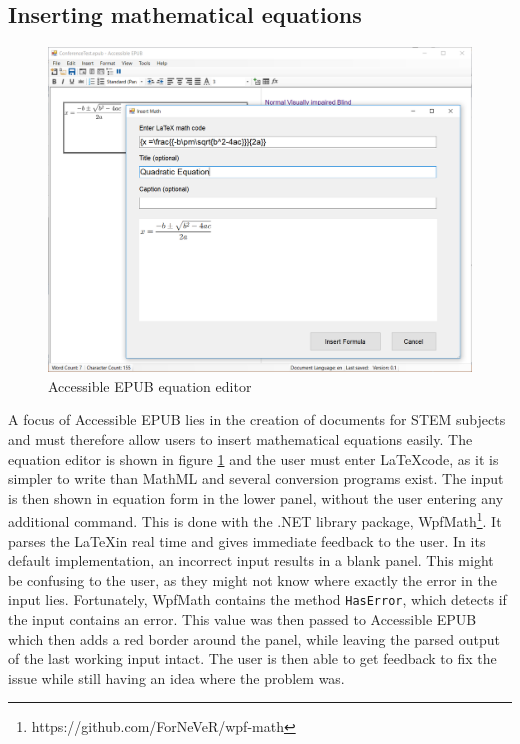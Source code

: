 \subsection{Inserting mathematical equations}

\begin{figure}[h]
	\centering
	\includegraphics[width=\textwidth*4/5]{figures/AccessibleEPUBequationNew.PNG}
	\caption{Accessible EPUB equation editor}
	\label{fig:equationEditor}
\end{figure}

A focus of Accessible EPUB lies in the creation of documents for STEM subjects and must therefore allow users to insert mathematical equations easily. The equation editor is shown in figure \ref{fig:equationEditor} and the user must enter \LaTeX code, as it is simpler to write than MathML and several conversion programs exist. The input is then shown in equation form in the lower panel, without the user entering any additional command. This is done with the .NET library package, WpfMath\footnote{https://github.com/ForNeVeR/wpf-math}. It parses the \LaTeX in real time and gives immediate feedback to the user. In its default implementation, an incorrect input results in a blank panel. This might be confusing to the user, as they might not know where exactly the error in the input lies. Fortunately, WpfMath contains the method \lstinline|HasError|, which detects if the input contains an error. This value was then passed to Accessible EPUB which then adds a red border around the panel, while leaving the parsed output of the last working input intact. The user is then able to get feedback to fix the issue while still having an idea where the problem was. 

